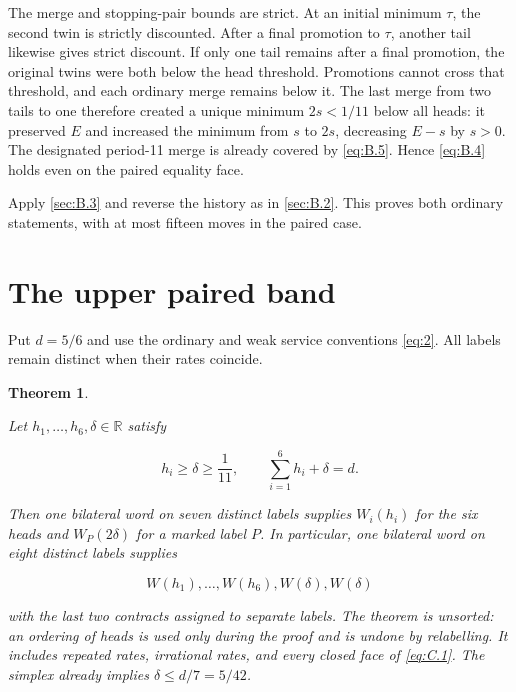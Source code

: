 \documentclass[11pt,a4paper]{article}
\newtheorem{theorem}{Theorem}
\begin{document}
The merge and stopping-pair bounds are strict. At an initial minimum \(\tau\), the second twin is strictly discounted. After a final promotion to \(\tau\), another tail likewise gives strict discount. If only one tail remains after a final promotion, the original twins were both below the head threshold. Promotions cannot cross that threshold, and each ordinary merge remains below it. The last merge from two tails to one therefore created a unique minimum \(2s<1/11\) below all heads: it preserved \(E\) and increased the minimum from \(s\) to \(2s\), decreasing \(E-s\) by \(s>0\). The designated period-11 merge is already covered by \eqref{eq:B.5}. Hence \eqref{eq:B.4} holds even on the paired equality face.

Apply \ref{sec:B.3} and reverse the history as in \ref{sec:B.2}. This proves both ordinary statements, with at most fifteen moves in the paired case.

\section{The upper paired band}\label{sec:C}

Put \(d=5/6\) and use the ordinary and weak service conventions \eqref{eq:2}. All labels remain distinct when their rates coincide.

\begin{theorem}\label{stmt:C.1}

 Let \(h_1,\ldots,h_6,\delta\in\mathbb R\) satisfy

\begin{equation}
h_i\ge\delta\ge\frac1{11},\qquad
 \sum_{i=1}^6h_i+\delta=d.
\tag{C.1}\label{eq:C.1}
\end{equation}

Then one bilateral word on seven distinct labels supplies \(W_i(h_i)\) for the six heads and \(W_P(2\delta)\) for a marked label \(P\). In particular, one bilateral word on eight distinct labels supplies

\begin{equation}
W(h_1),\ldots,W(h_6),W(\delta),W(\delta)
\tag{C.2}\label{eq:C.2}
\end{equation}

with the last two contracts assigned to separate labels. The theorem is unsorted: an ordering of heads is used only during the proof and is undone by relabelling. It includes repeated rates, irrational rates, and every closed face of \eqref{eq:C.1}. The simplex already implies \(\delta\le d/7=5/42\).

\end{theorem}
\end{document}
